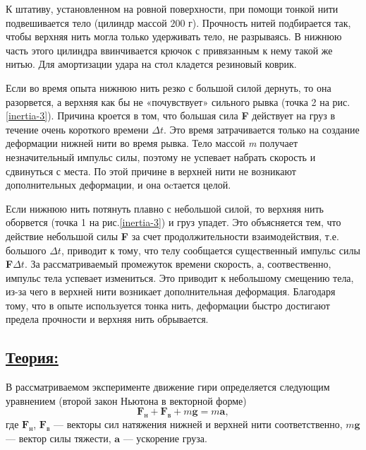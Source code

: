 \documentclass[14pt,a4paper,oneside]{extarticle}	%
\begin{document}
К штативу, установленном на ровной поверхности, при помощи тонкой нити подвешивается тело (цилиндр массой $ 200 $ г).
Прочность нитей подбирается так, чтобы верхняя нить могла только удерживать тело, не разрываясь.
В нижнюю часть этого цилиндра ввинчивается крючок с привязанным к нему такой же нитью.
Для амортизации удара на стол кладется резиновый коврик.

Если во время опыта нижнюю нить резко с большой силой дернуть, то она разорвется, а верхняя как бы не «почувствует» сильного рывка (точка 2 на рис.\ref{inertia-3}). 
Причина кроется в том, что большая сила \textbf{F} действует на груз в течение очень короткого времени $ \Delta t $. 
Это время затрачивается только на создание деформации нижней нити во время рывка. 
Тело массой \textit{m} получает незначительный импульс силы, поэтому не успевает набрать скорость и сдвинуться с места.
По этой причине в верхней нити не возникают дополнительных деформации, и она оcтается целой. 

Если нижнюю нить потянуть плавно с небольшой силой, то верхняя нить оборвется (точка 1 на рис.\ref{inertia-3}) и груз упадет.
Это объясняется тем, что действие небольшой силы \textbf{F} за счет продолжительности взаимодействия, т.е. большого $ \Delta t $, приводит к тому, что телу сообщается существенный импульс силы \textbf{F}$ \Delta t $.
За рассматриваемый промежуток времени скорость, а, соотвественно, импульс тела успевает измениться. 
Это приводит к небольшому смещению тела, из-за чего в верхней нити возникает дополнительная деформация.
Благодаря тому, что в опыте используется тонка нить, деформации быстро достигают предела прочности и верхняя нить обрывается. 

\newpage
\subsection*{\underline{Теория:}}

В рассматриваемом эксперименте движение гири определяется следующим уравнением (второй закон Ньютона в векторной форме) 
\begin{equation}\label{inertia-eq6}
	\textbf{F}_{\text{н}} + \textbf{F}_{\text{в}} + m\textbf{g} = m\textbf{a},
\end{equation}
где $ \textbf{F}_{\text{н}} $, $ \textbf{F}_{\text{в}} $ — векторы сил натяжения нижней и верхней нити соответственно, $ m\textbf{g} $ — вектор силы тяжести, $ \textbf{a} $ — ускорение груза.
\end{document}
